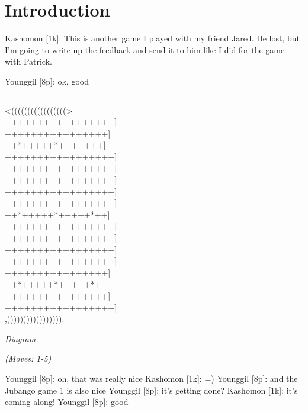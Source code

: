 \documentclass[letterpaper,12pt]{memoir}
\newcounter{GoFigure}[part]
\newcommand{\gofigure}{%
 \stepcounter{GoFigure}
 \centerline{\textit{Diagram.\thinspace\arabic{GoFigure}}}
}
\newcommand{\subtext}[1]{\centerline{\textit{#1}}}
\begin{document}
\chapter{Introduction}
Kashomon [1k]: This is another game I played with my friend Jared. He lost, but I'm going to write up the feedback and send it to him like I did for the game with Patrick.

Younggil [8p]: ok, good


\vfill

\rule{\textwidth}{0.5pt}

\begin{minipage}[t]{0.5\textwidth}
{\gnos
<(((((((((((((((((>\\
+++++++++++++++++]\\
++++++++++++++++]\\
++*+++++*+++++++]\\
+++++++++++++++++]\\
+++++++++++++++++]\\
+++++++++++++++++]\\
+++++++++++++++++]\\
+++++++++++++++++]\\
++*+++++*+++++*++]\\
+++++++++++++++++]\\
+++++++++++++++++]\\
+++++++++++++++++]\\
+++++++++++++++++]\\
++++++++++++++++]\\
++*+++++*+++++*+]\\
++++++++++++++++]\\
+++++++++++++++++]\\
,))))))))))))))))).\\
}
\gofigure

\subtext{(Moves: 1-5)}
\end{minipage}
\begin{minipage}[t]{0.5\textwidth}
\setlength{\parskip}{0.5em}
Younggil [8p]: oh, that was really nice
Kashomon [1k]: =)
Younggil [8p]: and the Jubango game 1 is also nice
Younggil [8p]: it's getting done?
Kashomon [1k]: it's coming along!
Younggil [8p]: good 


\end{minipage}
\vfill
\end{document}
